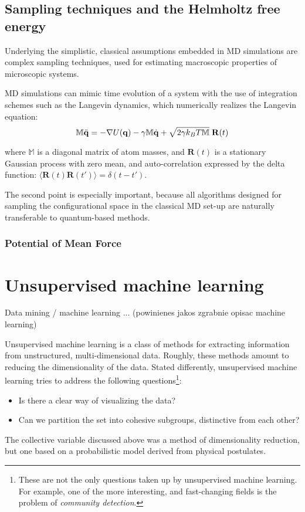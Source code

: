 \subsection{Sampling techniques and the Helmholtz free energy}

Underlying the simplistic, classical assumptions embedded in MD simulations are complex sampling techniques, used for estimating macroscopic properties of microscopic systems.

MD simulations can mimic time evolution of a system with the use of integration schemes such as the Langevin dynamics, which numerically realizes the Langevin equation:
\begin{equation}
 \mathbb{M}\ddot{\mathbf{q}} = -\nabla U(\mathbf{q}) -\gamma \mathbb{M}\dot{\mathbf{q}} + \sqrt{2\gamma k_BT\mathbb{M}}\hspace{0.1cm	}\mathbf{R}(t)
\end{equation}

where $\mathbb{M}$ is a diagonal matrix of atom masses, and $\mathbf{R}(t)$ is a stationary Gaussian process with zero mean, and auto-correlation expressed by the delta function: $\langle \mathbf{R}(t)\mathbf{R}(t') \rangle = \delta(t-t')$. 

The second point is especially important, because all algorithms designed for sampling the configurational space in the classical MD set-up are naturally transferable to quantum-based methods.

\subsubsection{Potential of Mean Force}



\section{Unsupervised machine learning}

Data mining / machine learning ... (powinienes jakos zgrabnie opisac machine learning)

Unsupervised machine learning is a class of methods for extracting information from unstructured, multi-dimensional data.
Roughly, these methods amount to reducing the dimensionality of the data.
Stated differently, unsupervised machine learning tries to address the following questions\footnote{
These are not the only questions taken up by unsupervised machine learning.
For example, one of the more interesting, and fast-changing fields is the problem of \emph{community detection}.}:
\begin{itemize}
 \item Is there a clear way of visualizing the data?
 \item Can we partition the set into cohesive subgroups, distinctive from each other?
\end{itemize}
The collective variable discussed above was a method of dimensionality reduction, but one based on a probabilistic model derived from physical postulates.

